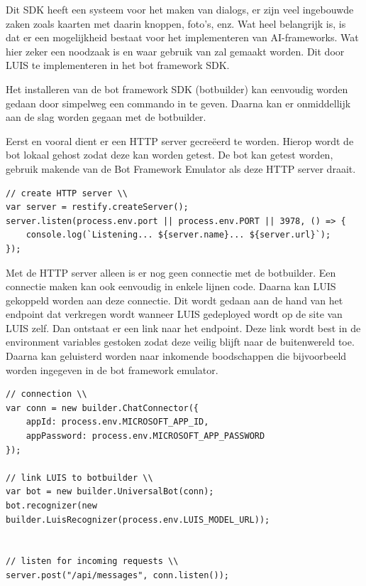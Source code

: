 Dit SDK heeft een systeem voor het maken van dialogs, er zijn veel ingebouwde zaken zoals kaarten met daarin knoppen, foto's, enz. Wat heel belangrijk is, is dat er een mogelijkheid bestaat voor het implementeren van AI-frameworks. Wat hier zeker een noodzaak is en waar gebruik van zal gemaakt worden. Dit door LUIS te implementeren in het bot framework SDK.

Het installeren van de bot framework SDK (botbuilder) kan eenvoudig worden gedaan door simpelweg een commando in te geven. Daarna kan er onmiddellijk aan de slag worden gegaan met de botbuilder.

Eerst en vooral dient er een HTTP server gecreëerd te worden. Hierop wordt de bot lokaal gehost zodat deze kan worden getest. De bot kan getest worden, gebruik makende van de Bot Framework Emulator als deze HTTP server draait.

\medskip
\begin{lstlisting}[caption=Creatie van de HTTP server]
// create HTTP server \\
var server = restify.createServer();
server.listen(process.env.port || process.env.PORT || 3978, () => {
	console.log(`Listening... ${server.name}... ${server.url}`);
});
\end{lstlisting}

Met de HTTP server alleen is er nog geen connectie met de botbuilder. Een connectie maken kan ook eenvoudig in enkele lijnen code. Daarna kan  LUIS gekoppeld worden aan deze connectie. Dit wordt gedaan aan de hand van het endpoint dat verkregen wordt wanneer LUIS gedeployed wordt op de site van LUIS zelf. Dan ontstaat er een link naar het endpoint. Deze link wordt best in de environment variables gestoken zodat deze veilig blijft naar de buitenwereld toe. Daarna kan geluisterd worden naar inkomende boodschappen die bijvoorbeeld worden ingegeven in de bot framework emulator. 

\medskip
\begin{lstlisting}[caption=Connectie en linken van LUIS]
// connection \\
var conn = new builder.ChatConnector({
	appId: process.env.MICROSOFT_APP_ID,
	appPassword: process.env.MICROSOFT_APP_PASSWORD
});

// link LUIS to botbuilder \\
var bot = new builder.UniversalBot(conn);
bot.recognizer(new builder.LuisRecognizer(process.env.LUIS_MODEL_URL));


// listen for incoming requests \\
server.post("/api/messages", conn.listen());
\end{lstlisting}

